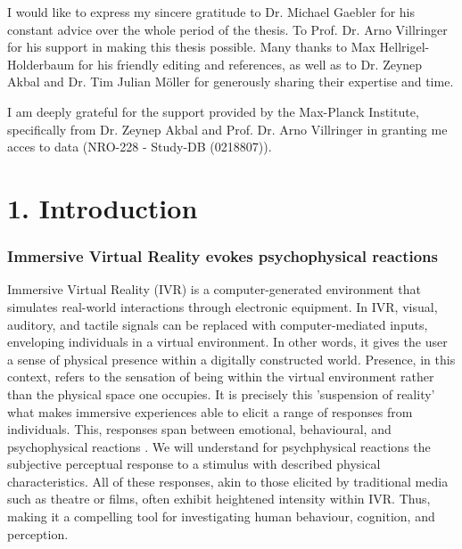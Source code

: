 \documentclass[12pt,oneside,openright]{report}
\begin{document}
\begin{adjustwidth}{1cm}{1cm}

I would like to express my sincere gratitude to Dr. Michael Gaebler for his constant advice over the whole period of the thesis. To Prof. Dr. Arno Villringer for his support in making this thesis possible. Many thanks to Max Hellrigel-Holderbaum for his friendly editing and references, as well as to Dr. Zeynep Akbal and Dr. Tim Julian Möller for generously sharing their expertise and time.

I am deeply grateful for the support provided by the Max-Planck Institute, specifically from Dr. Zeynep Akbal and Prof. Dr. Arno Villringer in granting me acces to data (NRO-228 - Study-DB (0218807)).
    
\end{adjustwidth}

\clearpage

\section*{1. Introduction}
\subsubsection*{Immersive Virtual Reality evokes psychophysical reactions}

Immersive Virtual Reality (IVR) is a computer-generated environment that simulates real-world interactions through electronic equipment. In IVR, visual, auditory, and tactile signals can be replaced with computer-mediated inputs, enveloping individuals in a virtual environment. In other words, it gives the user a sense of physical presence within a digitally constructed world. Presence, in this context, refers to the sensation of being within the virtual environment rather than the physical space one occupies. It is precisely this 'suspension of reality' what makes immersive experiences able to elicit a range of responses from individuals. This, responses span between emotional, behavioural, and psychophysical reactions \parencite{SanchezVives2005FromPT}. We will understand for psychphysical reactions the subjective perceptual response to a stimulus with described physical characteristics. All of these responses, akin to those elicited by traditional media such as theatre or films, often exhibit heightened intensity within IVR. Thus, making it a compelling tool for investigating human behaviour, cognition, and perception. 
\end{document}
